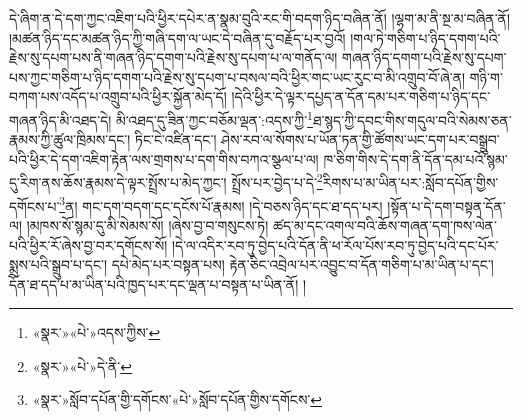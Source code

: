 དེ་ཞིག་ན་དེ་དག་ཀྱང་འཇིག་པའི་ཕྱིར་དཔེར་ན་སྣམ་བུའི་རང་གི་བདག་ཉིད་བཞིན་ནོ། །ལྷག་མ་ནི་སྔ་མ་བཞིན་ནོ། །མཚན་ཉིད་དང་མཚན་ཉིད་ཀྱི་གཞི་དག་ལ་ཡང་དེ་བཞིན་དུ་བརྗོད་པར་བྱའོ། །གལ་ཏེ་གཅིག་པ་ཉིད་དགག་པའི་རྗེས་སུ་དཔག་པས་ནི་གཞན་ཉིད་དགག་པའི་རྗེས་སུ་དཔག་པ་ལ་གནོད་ལ། གཞན་ཉིད་དགག་པའི་རྗེས་སུ་དཔག་པས་ཀྱང་གཅིག་པ་ཉིད་དགག་པའི་རྗེས་སུ་དཔག་པ་བསལ་བའི་ཕྱིར་གང་ཡང་རུང་བ་མི་འགྲུབ་བོ་ཞེ་ན། གཉི་ག་བཀག་པས་འདོད་པ་འགྲུབ་པའི་ཕྱིར་སྐྱོན་མེད་དོ། །དེའི་ཕྱིར་དེ་ལྟར་དཔྱད་ན་དོན་དམ་པར་གཅིག་པ་ཉིད་དང་གཞན་ཉིད་མི་འཐད་དེ། མི་འཐད་དུ་ཟིན་ཀྱང་བཅོམ་ལྡན་:འདས་ཀྱི་\footnote{«སྣར་»«པེ་»འདས་ཀྱིས་}ཐ་སྙད་ཀྱི་དབང་གིས་གདུལ་བའི་སེམས་ཅན་རྣམས་ཀྱི་ཚུལ་ཁྲིམས་དང་། ཏིང་ངེ་འཛིན་དང་། ཤེས་རབ་ལ་སོགས་པ་ཡོན་ཏན་གྱི་ཚོགས་ཡང་དག་པར་བསྒྲུབ་པའི་ཕྱིར་དེ་དག་འཇིག་རྟེན་ལས་གྲགས་པ་དག་གིས་བཀའ་སྩལ་པ་ལ། ཁ་ཅིག་གིས་དེ་དག་ནི་དོན་དམ་པའོ་སྙམ་དུ་རིག་ནས་ཆོས་རྣམས་དེ་ལྟར་སྤྲོས་པ་མེད་ཀྱང་། སྤྲོས་པར་བྱེད་པ་དེ་\footnote{«སྣར་»«པེ་»དེ་ནི་}རིགས་པ་མ་ཡིན་པར་:སློབ་དཔོན་གྱིས་དགོངས་པ་\footnote{«སྣར་»སློབ་དཔོན་གྱི་དགོངས་«པེ་»སློབ་དཔོན་གྱིས་དགོངས་}ན། གང་དག་བདག་དང་དངོས་པོ་རྣམས། །དེ་བཅས་ཉིད་དང་ཐ་དད་པར། །སྟོན་པ་དེ་དག་བསྟན་དོན་ལ། །མཁས་སོ་སྙམ་དུ་མི་སེམས་སོ། །ཞེས་བྱ་བ་གསུངས་ཏེ། ཚད་མ་དང་འགལ་བའི་ཆོས་གཞན་དག་ཁས་ལེན་པའི་ཕྱིར་རོ་ཞེས་བྱ་བར་དགོངས་སོ། །དེ་ལ་འདིར་རབ་ཏུ་བྱེད་པའི་དོན་ནི་ཕ་རོལ་པོས་རབ་ཏུ་བྱེད་པའི་དང་པོར་སྨྲས་པའི་སྒྲུབ་པ་དང་། དཔེ་མེད་པར་བསྟན་པས། རྟེན་ཅིང་འབྲེལ་པར་འབྱུང་བ་དོན་གཅིག་པ་མ་ཡིན་པ་དང་། དོན་ཐ་དད་པ་མ་ཡིན་པའི་ཁྱད་པར་དང་ལྡན་པ་བསྟན་པ་ཡིན་ནོ། །
